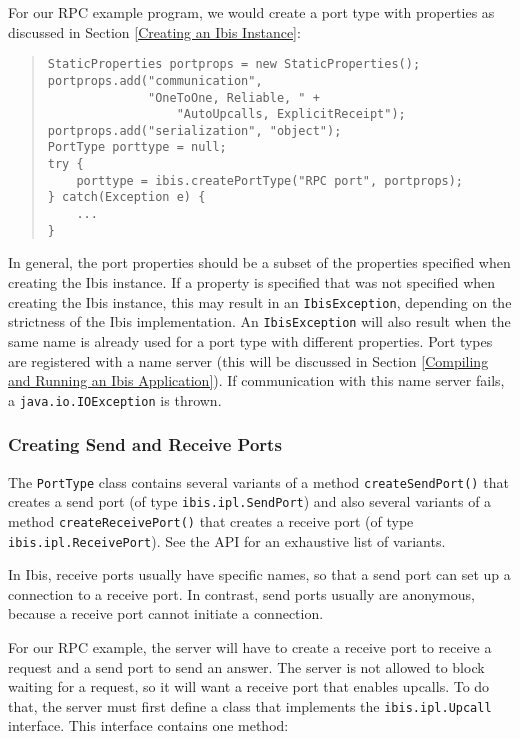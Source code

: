 \documentclass[10pt]{article}
\begin{document}
\noindent
For our RPC example program, we would create a port type with properties
as discussed in Section \ref{Creating an Ibis Instance}:

\begin{quote}
\begin{verbatim}
StaticProperties portprops = new StaticProperties();
portprops.add("communication",
              "OneToOne, Reliable, " + 
                  "AutoUpcalls, ExplicitReceipt");
portprops.add("serialization", "object");
PortType porttype = null;
try {
    porttype = ibis.createPortType("RPC port", portprops);
} catch(Exception e) {
    ...
}
\end{verbatim}
\end{quote}
\noindent
In general, the port properties should be a subset of the properties
specified when creating the Ibis instance. If a property is specified
that was not specified when creating the Ibis instance, this may
result in an \texttt{IbisException}, depending on the strictness of the
Ibis implementation.
An \texttt{IbisException} will also result when the same name is
already used for a port type with different properties.
Port types are registered with a name server
(this will be discussed in Section \ref{Compiling and Running an Ibis Application}).
If communication with this name server fails, a
\texttt{java.io.IOException} is thrown.

\subsubsection{Creating Send and Receive Ports}

The \texttt{PortType} class contains several variants of a method
\texttt{createSendPort()} that creates a send port (of type
\texttt{ibis.ipl.SendPort}) and
also several variants of a method \texttt{createReceivePort()} that
creates a receive port (of type \texttt{ibis.ipl.ReceivePort}).
See the API for an exhaustive list of variants.

In Ibis, receive ports usually have specific names, so that
a send port can set up a connection to a receive port. In contrast,
send ports usually are anonymous, because a receive port cannot
initiate a connection.

For our RPC example, the server will have to create a receive port
to receive a request and a send port to send an answer.
The server is not allowed to block waiting for a request, so it will
want a receive port that enables upcalls.
To do that, the server must first define a class that implements
the \texttt{ibis.ipl.Upcall} interface. This interface contains one
method:
\end{document}
